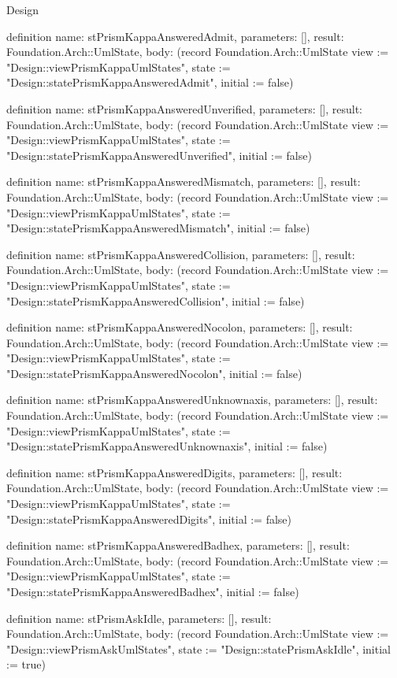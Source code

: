 \begin{lexlean}{Design}
\begin{semanticmodule}
definition{
  name: stPrismKappaAnsweredAdmit,
  parameters: [],
  result: Foundation.Arch::UmlState,
  body: (record Foundation.Arch::UmlState {view := "Design::viewPrismKappaUmlStates", state := "Design::statePrismKappaAnsweredAdmit", initial := false})
}

definition{
  name: stPrismKappaAnsweredUnverified,
  parameters: [],
  result: Foundation.Arch::UmlState,
  body: (record Foundation.Arch::UmlState {view := "Design::viewPrismKappaUmlStates", state := "Design::statePrismKappaAnsweredUnverified", initial := false})
}

definition{
  name: stPrismKappaAnsweredMismatch,
  parameters: [],
  result: Foundation.Arch::UmlState,
  body: (record Foundation.Arch::UmlState {view := "Design::viewPrismKappaUmlStates", state := "Design::statePrismKappaAnsweredMismatch", initial := false})
}

definition{
  name: stPrismKappaAnsweredCollision,
  parameters: [],
  result: Foundation.Arch::UmlState,
  body: (record Foundation.Arch::UmlState {view := "Design::viewPrismKappaUmlStates", state := "Design::statePrismKappaAnsweredCollision", initial := false})
}

definition{
  name: stPrismKappaAnsweredNocolon,
  parameters: [],
  result: Foundation.Arch::UmlState,
  body: (record Foundation.Arch::UmlState {view := "Design::viewPrismKappaUmlStates", state := "Design::statePrismKappaAnsweredNocolon", initial := false})
}

definition{
  name: stPrismKappaAnsweredUnknownaxis,
  parameters: [],
  result: Foundation.Arch::UmlState,
  body: (record Foundation.Arch::UmlState {view := "Design::viewPrismKappaUmlStates", state := "Design::statePrismKappaAnsweredUnknownaxis", initial := false})
}

definition{
  name: stPrismKappaAnsweredDigits,
  parameters: [],
  result: Foundation.Arch::UmlState,
  body: (record Foundation.Arch::UmlState {view := "Design::viewPrismKappaUmlStates", state := "Design::statePrismKappaAnsweredDigits", initial := false})
}

definition{
  name: stPrismKappaAnsweredBadhex,
  parameters: [],
  result: Foundation.Arch::UmlState,
  body: (record Foundation.Arch::UmlState {view := "Design::viewPrismKappaUmlStates", state := "Design::statePrismKappaAnsweredBadhex", initial := false})
}

definition{
  name: stPrismAskIdle,
  parameters: [],
  result: Foundation.Arch::UmlState,
  body: (record Foundation.Arch::UmlState {view := "Design::viewPrismAskUmlStates", state := "Design::statePrismAskIdle", initial := true})
}


\end{semanticmodule}
\end{lexlean}
